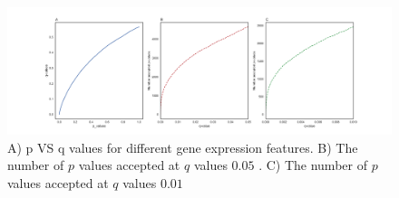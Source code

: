 \documentclass{article}
\begin{document}
	
\begin{figure}
\hspace*{-4cm}         
\centering
     \includegraphics[width=1.57\textwidth]{comb.png}
    \caption{A) p VS q values for  different gene expression features. B) The number of $p$ values accepted at $q$ values $0.05$ . C) The number of $p$ values accepted at $q$ values $0.01$}
    \label{fig:animals}
\end{figure}



\newpage


\end{document}
